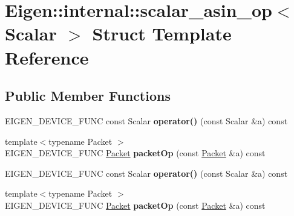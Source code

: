 \hypertarget{struct_eigen_1_1internal_1_1scalar__asin__op}{}\section{Eigen\+:\+:internal\+:\+:scalar\+\_\+asin\+\_\+op$<$ Scalar $>$ Struct Template Reference}
\label{struct_eigen_1_1internal_1_1scalar__asin__op}
\subsection*{Public Member Functions}
\begin{DoxyCompactItemize}
\item 
\mbox{\label{struct_eigen_1_1internal_1_1scalar__asin__op_ae646387bd9b3f531f52cbdb0f10bcb88}} 
E\+I\+G\+E\+N\+\_\+\+D\+E\+V\+I\+C\+E\+\_\+\+F\+U\+NC const Scalar {\bfseries operator()} (const Scalar \&a) const
\item 
\mbox{\label{struct_eigen_1_1internal_1_1scalar__asin__op_a8d6255ec515cd4e441f6f56e180aea10}} 
{\footnotesize template$<$typename Packet $>$ }\\E\+I\+G\+E\+N\+\_\+\+D\+E\+V\+I\+C\+E\+\_\+\+F\+U\+NC \hyperlink{union_eigen_1_1internal_1_1_packet}{Packet} {\bfseries packet\+Op} (const \hyperlink{union_eigen_1_1internal_1_1_packet}{Packet} \&a) const
\item 
\mbox{\label{struct_eigen_1_1internal_1_1scalar__asin__op_ae646387bd9b3f531f52cbdb0f10bcb88}} 
E\+I\+G\+E\+N\+\_\+\+D\+E\+V\+I\+C\+E\+\_\+\+F\+U\+NC const Scalar {\bfseries operator()} (const Scalar \&a) const
\item 
\mbox{\label{struct_eigen_1_1internal_1_1scalar__asin__op_a8d6255ec515cd4e441f6f56e180aea10}} 
{\footnotesize template$<$typename Packet $>$ }\\E\+I\+G\+E\+N\+\_\+\+D\+E\+V\+I\+C\+E\+\_\+\+F\+U\+NC \hyperlink{union_eigen_1_1internal_1_1_packet}{Packet} {\bfseries packet\+Op} (const \hyperlink{union_eigen_1_1internal_1_1_packet}{Packet} \&a) const
\end{DoxyCompactItemize}


